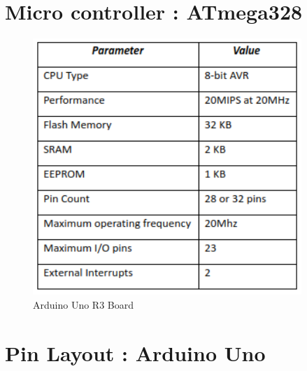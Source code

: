 \section{Micro controller : ATmega328}
\begin{figure}
    \centering
 \includegraphics[width=4in]{Chapters/images/ardtab.png}
    \caption{Arduino Uno R3 Board}
    \label{fig:my_label}
\end{figure}

\section{Pin Layout : Arduino Uno}





